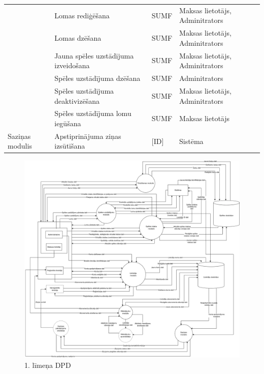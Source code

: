 \begin{tabularx}{\linewidth}{|p{2cm}|X|p{2.7cm}|X|}
	                                              & Lomas rediģēšana                         & \stepcounter{rownum}SUMF\therownum & Maksas lietotājs, Adminitrators                        \\ \cline{2-4}
	                                              & Lomas dzēšana                            & \stepcounter{rownum}SUMF\therownum & Maksas lietotājs, Adminitrators                        \\ \cline{2-4}
	                                              & Jauna spēles uzstādījuma izveidošana     & \stepcounter{rownum}SUMF\therownum & Maksas lietotājs, Adminitrators                        \\ \cline{2-4}
	                                              & Spēles uzstādījuma dzēšana               & \stepcounter{rownum}SUMF\therownum & Adminitrators                                          \\ \cline{2-4}
	                                              & Spēles uzstādījuma deaktivizēšana        & \stepcounter{rownum}SUMF\therownum & Maksas lietotājs, Adminitrators                        \\ \cline{2-4}
	                                              & Spēles uzstādījuma lomu iegūšana         & \stepcounter{rownum}SUMF\therownum & Maksas lietotājs                                       \\ \hline
	\setcounter{rownum}{0}
	\parbox{2cm}{Saziņas modulis}                 & Apstiprinājuma ziņas izsūtīšana          & [ID]\therownum & Sistēma                                                \\ \hline
\end{tabularx}

\begin{figure}[h]
	\centering
	\includegraphics[width=\linewidth]{./src/requirements/img/DPD_1.png}
	\caption{1. līmeņa DPD}
	\label{fig:dpd_1}
\end{figure}
